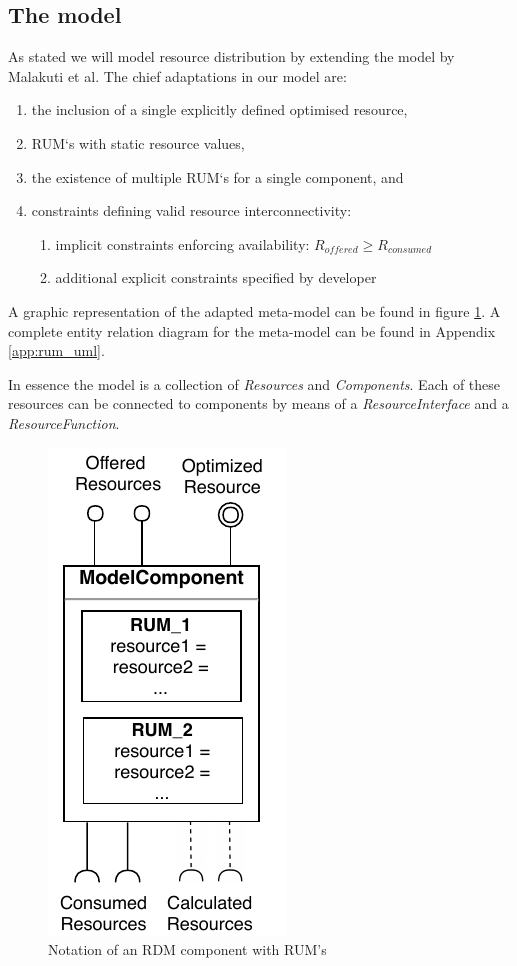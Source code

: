 \subsection{The model}
As stated we will model resource distribution by extending the model by Malakuti et al\cite{steven_te_brinke}. The chief adaptations in our model are:
\begin{enumerate}
\nospace
\item the inclusion of a single explicitly defined optimised resource,
\item RUM`s with static resource values,
\item the existence of multiple RUM`s for a single component, and
\item constraints defining valid resource interconnectivity:
\begin{enumerate}
\nospace
\item implicit constraints enforcing availability: $R_{offered} \geq R_{consumed}$
\item additional explicit constraints specified by developer
\end{enumerate}
\end{enumerate}

A graphic representation of the adapted meta-model can be found in figure \ref{fig:component}. A complete entity relation diagram for the meta-model can be found in Appendix \ref{app:rum_uml}. 

In essence the model is a collection of \emph{Resources} and \emph{Components}. Each of these resources can be connected to components by means of a \emph{ResourceInterface} and a \emph{ResourceFunction}. 
\begin{figure}
\centering
  \includegraphics[width=0.3\linewidth]{resources/img/component.pdf}
  \caption{Notation of an RDM component with RUM's}
  \label{fig:component}
\end{figure}

